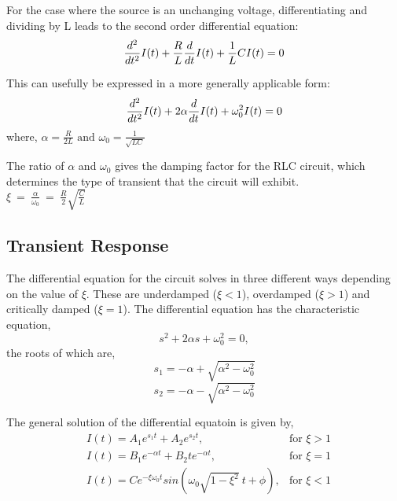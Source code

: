 \documentclass[12pt, twosides]{article}
\newcommand{\curr}{I}
\newcommand{\res}{R}
\newcommand{\capc}{C}
\newcommand{\ind}{L}
\newcommand{\der}[1]{
\ifnum#1=1
	\frac{d}{dt}
\else
	\frac{d^#1}{dt^#1}
\fi
}
\begin{document}
		\noindent
		For the case where the source is an unchanging voltage, differentiating and dividing by L leads to the second order differential equation:
		\[ \der{2} \curr(t) + \frac{\res}{\ind} \der{1} \curr(t) + \frac{1}{\ind}{\capc} \curr(t) = 0 \]
		
		\noindent
		This can usefully be expressed in a more generally applicable form:
		\[ \der{2} \curr(t) + 2 \alpha \der{1} \curr(t) + \omega_0^2 \curr(t) = 0 \]
		where, \( \alpha = \frac{\res}{2 \ind} \text{ and } \omega_0 = \frac{1}{\sqrt{\ind \capc}} \)

		The ratio of \(\alpha\) and \(\omega_0\)  gives the damping factor for the RLC circuit, which determines the type of transient that the circuit  will exhibit.\\
		\(\xi \ = \ \frac{\alpha}{\omega_0} \ = \ \frac{R}{2} \sqrt{\frac{\capc}{\ind}} \)
		
		\subsection{Transient Response}
			The differential equation for the circuit solves in three different ways depending on the value of \(\xi\).
			These are underdamped (\(\xi < 1\)), overdamped (\(\xi > 1\)) and critically damped (\(\xi = 1\)). The differential equation has the characteristic equation,
			\[ s^2 + 2 \alpha s + \omega_0^2 =0, \]
			the roots of which are,
			\[ s_1 = - \alpha + \sqrt{\alpha^2 - \omega_0^2} \]
			\[ s_2 = - \alpha - \sqrt{\alpha^2 - \omega_0^2} \]
			
			\noindent
			The general solution of the differential equatoin is given by,
			\begin{equation}
			\begin{aligned}
				& \curr(t) = A_1 e^{s_1 t} + A_2 e^{s_2 t},& \text{for } \xi > 1 \\
			 	& \curr(t) = B_1 e^{-\alpha t} + B_2 t e^{-\alpha t},&\text{for } \xi = 1 \\
				& \curr(t) = C e^{-\xi \omega_0 t} sin(\omega_0 \sqrt{1 - \xi^2}\  t + \phi),& \text{for } \xi < 1
			\end{aligned}
			\end{equation}
\end{document}
